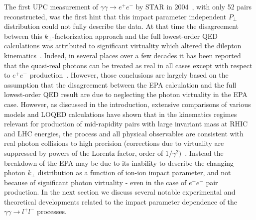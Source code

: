 \documentclass[twocolumn,epjc3]{svjour3}\sloppy
\begin{document}
The first UPC measurement of $\gamma\gamma \rightarrow e^+e^-$ by STAR in 2004~\cite{starcollaborationProductionEnsuremathPairs2004}, with only 52 pairs reconstructed, was the first hint that this impact parameter independent $P_\perp$ distribution could not fully describe the data.
At that time the disagreement between this $k_\perp$-factorization approach and the full lowest-order QED calculations was attributed to significant virtuality which altered the dilepton kinematics~\cite{baltzTwophotonInteractionsNuclear2009,starcollaborationProductionEnsuremathPairs2004}. 
Indeed, in several places over a few decades it has been reported that the quasi-real photons can be treated as real in all cases except with respect to $e^+e^-$ production~\cite{bertulaniPhysicsUltraperipheralNuclear2005a,henckenImpactparameterDependenceTotal1995}. 
However, those conclusions are largely based on the assumption that the disagreement between the EPA calculation and the full lowest-order QED result are due to neglecting the photon virtuality in the EPA case. 
However, as discussed in the introduction, extensive comparisons of various models and LOQED calculations have shown that in the kinematics regimes relevant for production of mid-rapidity pairs with large invariant mass at RHIC and LHC energies, the process and all physical observables are consistent with real photon collisions to high precision (corrections due to virtuality are suppressed by powers of the Lorentz factor, order of $1/\gamma^2)$~\cite{PhysRevC.47.2308}.
Instead the breakdown of the EPA may be due to its inability to describe the changing photon $k_\perp$ distribution as a function of ion-ion impact parameter, and not because of significant photon virtuality - even in the case of $e^+e^-$ pair production.
In the next section we discuss several notable experimental and theoretical developments related to the impact parameter dependence of the $\gamma\gamma \rightarrow l^+l^-$ processes.


\end{document}
